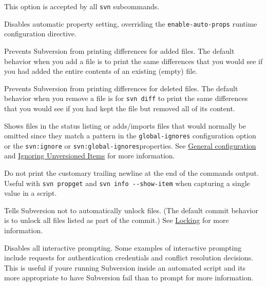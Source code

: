 \begin{description}
This option is accepted by all \texttt{svn} subcommands.
\item[\protect\phantomsection\label{svn.ref.svn.sw.no_auto_props}{}\texttt{-\/-no-auto-props}]
Disables automatic property setting, overriding the
\texttt{enable-auto-props} runtime configuration directive.
\item[\protect\phantomsection\label{svn.ref.svn.sw.no_diff_added}{}\texttt{-\/-no-diff-added}]
Prevents Subversion from printing differences for added files. The
default behavior when you add a file is to print the same differences
that you would see if you had added the entire contents of an existing
(empty) file.
\item[\protect\phantomsection\label{svn.ref.svn.sw.no_diff_deleted}{}\texttt{-\/-no-diff-deleted}]
Prevents Subversion from printing differences for deleted files. The
default behavior when you remove a file is for \texttt{svn\ diff} to
print the same differences that you would see if you had kept the file
but removed all of its content.
\item[\protect\phantomsection\label{svn.ref.svn.sw.no_ignore}{}\texttt{-\/-no-ignore}]
Shows files in the status listing or adds/imports files that would
normally be omitted since they match a pattern in the
\texttt{global-ignores} configuration option or the \texttt{svn:ignore}
or \texttt{svn:global-ignores}properties. See
\hyperref[svn.advanced.confarea.opts.config]{General configuration} and
\hyperref[svn.advanced.props.special.ignore]{Ignoring Unversioned Items}
for more information.
\item[\protect\phantomsection\label{svn.ref.svn.sw.no_newline}{}\texttt{-\/-no-newline}]
Do not print the customary trailing newline at the end of the
command\textquotesingle s output. Useful with \texttt{svn\ propget} and
\texttt{svn\ info\ -\/-show-item} when capturing a single value in a
script.
\item[\protect\phantomsection\label{svn.ref.svn.sw.no_unlock}{}\texttt{-\/-no-unlock}]
Tells Subversion not to automatically unlock files. (The default commit
behavior is to unlock all files listed as part of the commit.) See
\hyperref[svn.advanced.locking]{Locking} for more information.
\item[\protect\phantomsection\label{svn.ref.svn.sw.non_interactive}{}\texttt{-\/-non-interactive}]
Disables all interactive prompting. Some examples of interactive
prompting include requests for authentication credentials and conflict
resolution decisions. This is useful if you\textquotesingle re running
Subversion inside an automated script and it\textquotesingle s more
appropriate to have Subversion fail than to prompt for more information.


\end{description}
